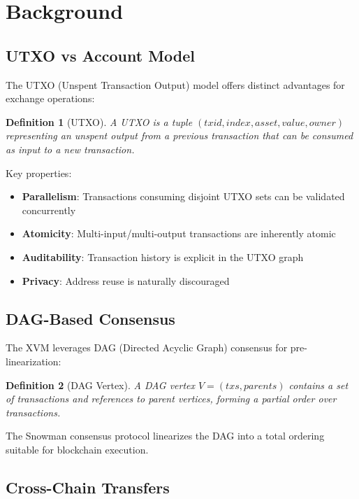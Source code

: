 \documentclass[11pt,a4paper]{article}
\newtheorem{definition}{Definition}
\begin{document}
\section{Background}

\subsection{UTXO vs Account Model}

The UTXO (Unspent Transaction Output) model offers distinct advantages for exchange operations:

\begin{definition}[UTXO]
A UTXO is a tuple $(txid, index, asset, value, owner)$ representing an unspent output from a previous transaction that can be consumed as input to a new transaction.
\end{definition}

Key properties:
\begin{itemize}
    \item \textbf{Parallelism}: Transactions consuming disjoint UTXO sets can be validated concurrently
    \item \textbf{Atomicity}: Multi-input/multi-output transactions are inherently atomic
    \item \textbf{Auditability}: Transaction history is explicit in the UTXO graph
    \item \textbf{Privacy}: Address reuse is naturally discouraged
\end{itemize}

\subsection{DAG-Based Consensus}

The XVM leverages DAG (Directed Acyclic Graph) consensus for pre-linearization:

\begin{definition}[DAG Vertex]
A DAG vertex $V = (txs, parents)$ contains a set of transactions and references to parent vertices, forming a partial order over transactions.
\end{definition}

The Snowman consensus protocol linearizes the DAG into a total ordering suitable for blockchain execution.

\subsection{Cross-Chain Transfers}
\end{document}
